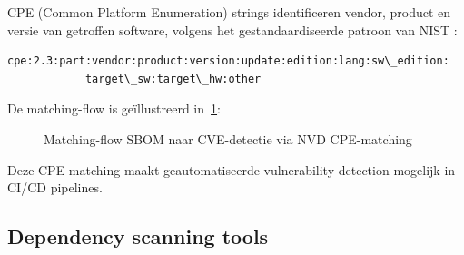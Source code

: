 CPE (Common Platform Enumeration) strings identificeren vendor, product en versie van getroffen software, volgens het gestandaardiseerde patroon van NIST \autocite{CPE_23}:
\begin{verbatim}
cpe:2.3:part:vendor:product:version:update:edition:lang:sw\_edition:
            target\_sw:target\_hw:other
\end{verbatim}

De matching-flow is geïllustreerd in~\ref{fig:cpe-matching-flow}:

\begin{figure}[h]
  \centering
  \caption{Matching-flow SBOM naar CVE-detectie via NVD CPE-matching \autocite{NVD_API}}
  \label{fig:cpe-matching-flow}
\end{figure}
\FloatBarrier

Deze CPE-matching maakt geautomatiseerde vulnerability detection mogelijk in CI/CD pipelines.

\subsection{Dependency scanning tools}

